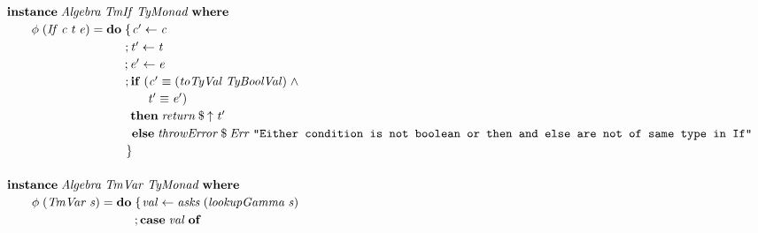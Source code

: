 \documentclass[10pt]{article}
\newcommand{\Conid}[1]{\mathit{#1}}
\newcommand{\Varid}[1]{\mathit{#1}}
\begin{document}
\begin{tabbing}
${}$\\
${\hskip1.00em\relax\mathbf{instance}\;\Conid{Algebra}\;\Conid{TmIf}\;\Conid{TyMonad}\;\mathbf{where}}$\\
${\hskip1.00em\relax\hskip2.00em\relax\Varid{\phi}\;(\Conid{If}\;\Varid{c}\;\Varid{t}\;\Varid{e})\mathrel{=}\mathbf{do}\;\{\mskip1.5mu \Varid{c'}\leftarrow \Varid{c}}$\\
${\hskip1.00em\relax\hskip2.00em\relax\phantom{\Varid{\phi}\;(\Conid{If}\;\Varid{c}\;\Varid{t}\;\Varid{e})\mathrel{=}\mathbf{do}\;\mbox{}};\Varid{t'}\leftarrow \Varid{t}}$\\
${\hskip1.00em\relax\hskip2.00em\relax\phantom{\Varid{\phi}\;(\Conid{If}\;\Varid{c}\;\Varid{t}\;\Varid{e})\mathrel{=}\mathbf{do}\;\mbox{}};\Varid{e'}\leftarrow \Varid{e}}$\\
${\hskip1.00em\relax\hskip2.00em\relax\phantom{\Varid{\phi}\;(\Conid{If}\;\Varid{c}\;\Varid{t}\;\Varid{e})\mathrel{=}\mathbf{do}\;\mbox{}};\mathbf{if}\;(\Varid{c'}\equiv (\Varid{toTyVal}\;\Conid{TyBoolVal})\mathrel{\wedge}}$\\
${\hskip1.00em\relax\hskip2.00em\relax\phantom{\Varid{\phi}\;(\Conid{If}\;\Varid{c}\;\Varid{t}\;\Varid{e})\mathrel{=}\mathbf{do}\;\mbox{}}\phantom{;\mathbf{if}\;(\mbox{}}\Varid{t'}\equiv \Varid{e'})}$\\
${\hskip1.00em\relax\hskip2.00em\relax\phantom{\Varid{\phi}\;(\Conid{If}\;\Varid{c}\;\Varid{t}\;\Varid{e})\mathrel{=}\mathbf{do}\;\mbox{}}\phantom{;\mbox{}}\mathbf{then}\;\Varid{return}\mathbin{\$}\Varid{\uparrow}\;\Varid{t'}}$\\
${\hskip1.00em\relax\hskip2.00em\relax\phantom{\Varid{\phi}\;(\Conid{If}\;\Varid{c}\;\Varid{t}\;\Varid{e})\mathrel{=}\mathbf{do}\;\mbox{}}\phantom{;\mbox{}}\mathbf{else}\;\Varid{throwError}\mathbin{\$}\Conid{Err}\;\text{\tt \char34 Either~condition~is~not~boolean~or~then~and~else~are~not~of~same~type~in~If\char34}}$\\
${\hskip1.00em\relax\hskip2.00em\relax\phantom{\Varid{\phi}\;(\Conid{If}\;\Varid{c}\;\Varid{t}\;\Varid{e})\mathrel{=}\mathbf{do}\;\mbox{}}\mskip1.5mu\}}$\\
${}$\\
${\hskip1.00em\relax\mathbf{instance}\;\Conid{Algebra}\;\Conid{TmVar}\;\Conid{TyMonad}\;\mathbf{where}}$\\
${\hskip1.00em\relax\hskip2.00em\relax\Varid{\phi}\;(\Conid{TmVar}\;\Varid{s})\mathrel{=}\mathbf{do}\;\{\mskip1.5mu \Varid{val}\leftarrow \Varid{asks}\;(\Varid{lookupGamma}\;\Varid{s})}$\\
${\hskip1.00em\relax\hskip2.00em\relax\phantom{\Varid{\phi}\;(\Conid{TmVar}\;\Varid{s})\mathrel{=}\mathbf{do}\;\mbox{}};\mathbf{case}\;\Varid{val}\;\mathbf{of}}$\\

\end{tabbing}
\end{document}
